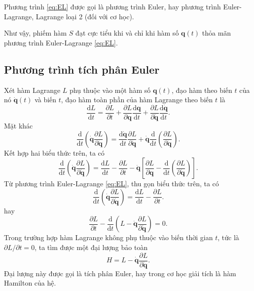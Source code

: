 Phương trình \eqref{eq:EL} được gọi là phương trình Euler, hay phương trình Euler-Lagrange, Lagrange loại 2 (đối với cơ học). 

Như vậy, phiếm hàm \(S\) đạt cực tiểu khi và chỉ khi hàm số \(\mathbf{q}(t)\) thỏa mãn phương trình Euler-Lagrange \eqref{eq:EL}.

\subsection{Phương trình tích phân Euler}

Xét hàm Lagrange \(L\) phụ thuộc vào một hàm số \(\mathbf{q}(t)\), đạo hàm theo biến \(t\) của nó \(\mathbf{\dot{q}}(t)\) và biến \(t\), đạo hàm toàn phần của hàm Lagrange theo biến \(t\) là
\begin{equation}
    \dfrac{\mathrm{d} L}{\mathrm{d} t} = \frac{\partial L}{\partial t} + \frac{\partial L}{\partial \mathbf{q}} \frac{\mathrm{d} \mathbf{q}}{\mathrm{d} t} + \frac{\partial L}{\partial \mathbf{\dot{q}}} \frac{\mathrm{d} \mathbf{\dot{q}}}{\mathrm{d} t}.
\end{equation}
Mặt khác
\begin{equation}
    \dfrac{\mathrm{d} }{\mathrm{d} t} \left( \mathbf{\dot{q}} \dfrac{\partial L}{\partial \mathbf{\dot{q}}} \right) = \dfrac{\mathrm{d} \mathbf{\dot{q}}}{\mathrm{d} t} \dfrac{\partial L}{\partial \mathbf{\dot{q}}} + \mathbf{\dot{q}} \dfrac{\mathrm{d}}{\mathrm{d} t} \left( \dfrac{\partial L}{\partial \mathbf{\dot{q}}} \right).
\end{equation}
Kết hợp hai biểu thức trên, ta có
\begin{equation}
    \dfrac{\mathrm{d} }{\mathrm{d} t} \left( \mathbf{\dot{q}} \dfrac{\partial L}{\partial \mathbf{\dot{q}}} \right) = \dfrac{\mathrm{d} L}{\mathrm{d} t} - \dfrac{\partial L}{\partial t} - \mathbf{\dot{q}} \left[ \dfrac{\partial L}{\partial \mathbf{q}} - \dfrac{\mathrm{d}}{\mathrm{d}t} \left( \dfrac{\partial L}{\partial \mathbf{\dot{q}}}\right) \right].
\end{equation}
Từ phương trình Euler-Lagrange \eqref{eq:EL}, thu gọn biểu thức trên, ta có
\begin{equation}
    \dfrac{\mathrm{d} }{\mathrm{d} t} \left( \mathbf{\dot{q}} \dfrac{\partial L}{\partial \mathbf{\dot{q}}} \right) = \dfrac{\mathrm{d} L}{\mathrm{d} t} - \dfrac{\partial L}{\partial t}.
\end{equation}
hay
\begin{equation}
    \dfrac{\partial L}{\partial t} - \dfrac{\mathrm{d} }{\mathrm{d} t} \left( L - \mathbf{\dot{q}} \dfrac{\partial L}{\partial \mathbf{\dot{q}}} \right) = 0.
\end{equation}
Trong trường hợp hàm Lagrange không phụ thuộc vào biến thời gian \(t\), tức là \(\partial L/\partial t = 0\), ta tìm được một đại lượng bảo toàn
\begin{equation}
    H = L - \mathbf{\dot{q}} \dfrac{\partial L}{\partial \mathbf{\dot{q}}}.
\end{equation}
Đại lượng này được gọi là tích phân Euler, hay trong cơ học giải tích là hàm Hamilton của hệ.

